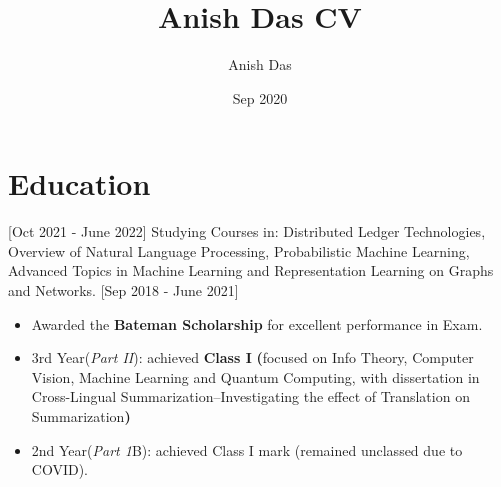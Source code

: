 \documentclass[11pt]{article}
\title{Anish Das CV}
\author{Anish Das}
\date{Sep 2020}
\begin{document}

\makecvtitle %

\section{ Education}
[Oct 2021 - June 2022]
Studying Courses in: Distributed Ledger Technologies, Overview of Natural Language Processing, Probabilistic Machine Learning, Advanced Topics in Machine Learning and Representation Learning on Graphs and Networks.
[Sep 2018 - June 2021]
\begin{itemize}
    \item Awarded the \textbf{Bateman Scholarship} for excellent performance in Exam. 
    \item 3rd Year(\textit{Part II}): achieved \textbf{Class I}  \textbf{(}focused on Info Theory, Computer Vision, Machine Learning and Quantum Computing, with dissertation in Cross-Lingual Summarization--Investigating the effect of Translation on Summarization\textbf{)}
    \item 2nd Year(\textit{Part 1}B): achieved Class I mark (remained unclassed due to COVID).
    
\end{itemize}

\end{document}
